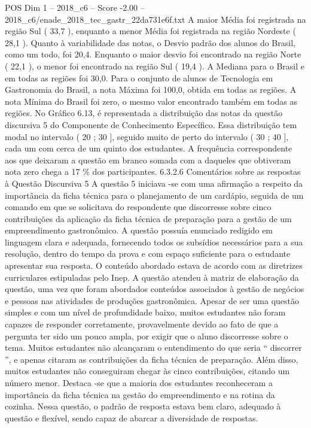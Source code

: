 \begin{textsample}{POS Dim 1 – 2018\_c6 – Score -2.00 – 2018\_c6/enade\_2018\_tec\_gastr\_22da731e6f.txt}
A maior Média foi registrada na região Sul ( 33,7 ), enquanto a menor Média foi registrada na região Nordeste ( 28,1 ).
Quanto à variabilidade das notas, o Desvio padrão dos alunos do Brasil, como um todo, foi 20,4.
Enquanto o maior desvio foi encontrado na região Norte ( 22,1 ), o menor foi encontrado na região Sul ( 19,4 ).
A Mediana para o Brasil e em todas as regiões foi 30,0.
Para o conjunto de alunos de Tecnologia em Gastronomia do Brasil, a nota Máxima foi 100,0, obtida em todas as regiões.
A nota Mínima do Brasil foi zero, o mesmo valor encontrado também em todas as regiões.
No Gráfico 6.13, é representada a distribuição das notas da questão discursiva 5 do Componente de Conhecimento Específico.
Essa distribuição tem modal no intervalo ( 20 ; 30 ], seguido muito de perto do intervalo ( 30 ; 40 ], cada um com cerca de um quinto dos estudantes.
A frequência correspondente aos que deixaram a questão em branco somada com a daqueles que obtiveram nota zero chega a 17 \% dos participantes. 6.3.2.6 Comentários sobre as respostas à Questão Discursiva 5 A questão 5 iniciava -se com uma afirmação a respeito da importância da ficha técnica para o planejamento de um cardápio, seguida de um comando em que se solicitava do respondente que discorresse sobre cinco contribuições da aplicação da ficha técnica de preparação para a gestão de um empreendimento gastronômico.
A questão possuía enunciado redigido em linguagem clara e adequada, fornecendo todos os subsídios necessários para a sua resolução, dentro do tempo da prova e com espaço suficiente para o estudante apresentar sua resposta.
O conteúdo abordado estava de acordo com as diretrizes curriculares estipuladas pelo Inep.
A questão atendeu à matriz de elaboração da questão, uma vez que foram abordados conteúdos associados à gestão de negócios e pessoas nas atividades de produções gastronômica.
Apesar de ser uma questão simples e com um nível de profundidade baixo, muitos estudantes não foram capazes de responder corretamente, provavelmente devido ao fato de que a pergunta ter sido um pouco ampla, por exigir que o aluno discorresse sobre o tema.
Muitos estudantes não alcançaram o entendimento do que seria “ discorrer ”, e apenas citaram as contribuições da ficha técnica de preparação.
Além disso, muitos estudantes não conseguiram chegar às cinco contribuições, citando um número menor.
Destaca -se que a maioria dos estudantes reconheceram a importância da ficha técnica na gestão do empreendimento e na rotina da cozinha.
Nessa questão, o padrão de resposta estava bem claro, adequado à questão e flexível, sendo capaz de abarcar a diversidade de respostas.

\end{textsample}
